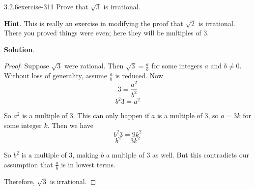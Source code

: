 \documentclass[twoside,11pt,]{book}
\numberwithin{equation}{chapter}
\begin{document}
\begin{divisionsolution}{3.2.6}{}{exercise-311}%
\hypertarget{p-4140}{}%
Prove that \(\sqrt 3\) is irrational.%
\par\smallskip%
\noindent\textbf{Hint}.\quad%
\hypertarget{p-4141}{}%
This is really an exercise in modifying the proof that \(\sqrt{2}\) is irrational.  There you proved things were even; here they will be multiples of 3.%
\par\smallskip%
\noindent\textbf{Solution}.\quad%
\begin{proof}{}
\hypertarget{p-4142}{}%
Suppose \(\sqrt{3}\) were rational. Then \(\sqrt{3} = \frac{a}{b}\) for some integers \(a\) and \(b \ne 0\). Without loss of generality, assume \(\frac{a}{b}\) is reduced. Now%
\begin{equation*}
3 = \frac{a^2}{b^2}
\end{equation*}
%
\begin{equation*}
b^2 3 = a^2
\end{equation*}
%
\par
\hypertarget{p-4143}{}%
So \(a^2\) is a multiple of 3. This can only happen if \(a\) is a multiple of 3, so \(a = 3k\) for some integer \(k\). Then we have%
\begin{equation*}
b^2 3 = 9k^2
\end{equation*}
%
\begin{equation*}
b^2 = 3k^2
\end{equation*}
%
\par
\hypertarget{p-4144}{}%
So \(b^2\) is a multiple of 3, making \(b\) a multiple of 3 as well. But this contradicts our assumption that \(\frac{a}{b}\) is in lowest terms.%
\par
\hypertarget{p-4145}{}%
Therefore, \(\sqrt{3}\) is irrational.%
\end{proof}
\end{divisionsolution}%
\end{document}
